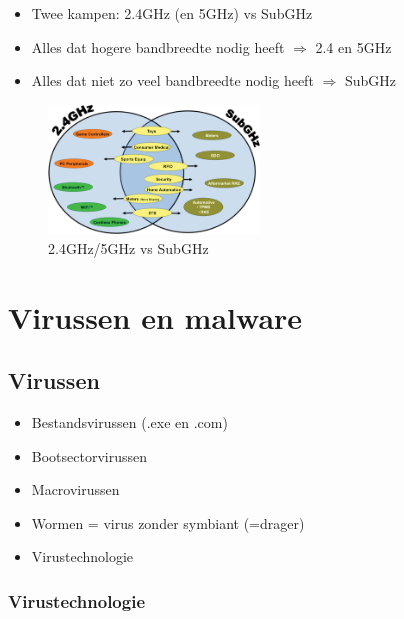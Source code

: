 \documentclass{article}
\begin{document}
\begin{itemize}
    \item Twee kampen: 2.4GHz (en 5GHz) vs SubGHz
    \item Alles dat hogere bandbreedte nodig heeft $\Rightarrow$ 2.4 en 5GHz
    \item Alles dat niet zo veel bandbreedte nodig heeft $\Rightarrow$ SubGHz
\end{itemize}


\begin{figure}[H]
    \centering
    \includegraphics[width=0.5\textwidth]{2.4-subghz.png}
    \caption{2.4GHz/5GHz vs SubGHz}
\end{figure}


\section{Virussen en malware}

\subsection{Virussen}

\begin{itemize}
    \item Bestandsvirussen (.exe en .com)
    \item Bootsectorvirussen
    \item Macrovirussen
    \item Wormen = virus zonder symbiant (=drager)
    \item Virustechnologie
\end{itemize}

\subsubsection{Virustechnologie}
\end{document}
